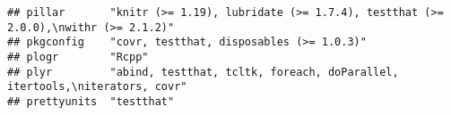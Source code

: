 \documentclass[]{article}
\begin{document}
\begin{verbatim}
## pillar       "knitr (>= 1.19), lubridate (>= 1.7.4), testthat (>= 2.0.0),\nwithr (>= 2.1.2)"                                                                                                                                                                                                                                                                                                                                                                                                                                                                                                           
## pkgconfig    "covr, testthat, disposables (>= 1.0.3)"                                                                                                                                                                                                                                                                                                                                                                                                                                                                                                                                                  
## plogr        "Rcpp"                                                                                                                                                                                                                                                                                                                                                                                                                                                                                                                                                                                    
## plyr         "abind, testthat, tcltk, foreach, doParallel, itertools,\niterators, covr"                                                                                                                                                                                                                                                                                                                                                                                                                                                                                                                
## prettyunits  "testthat"                                                                                                                                                                                                                                                                                                                                                                                                                                                                                                                                                                                

\end{verbatim}
\end{document}
